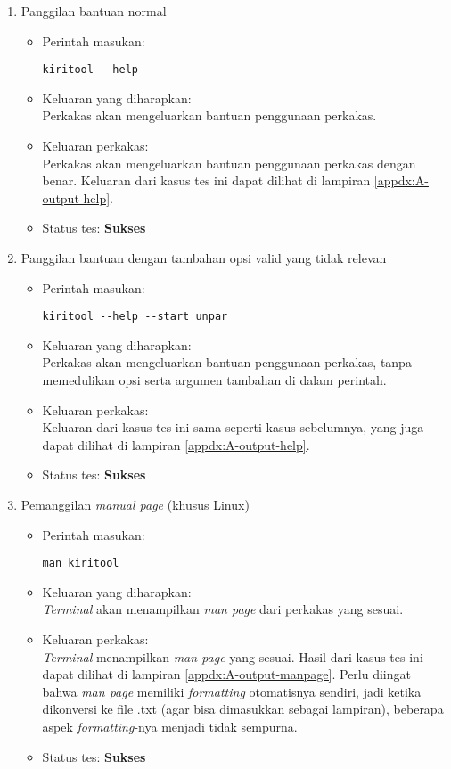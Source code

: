 \begin{enumerate}
	\item Panggilan bantuan normal
	\begin{itemize}
		\item Perintah masukan:
		\begin{lstlisting}
kiritool --help
		\end{lstlisting}
		\item Keluaran yang diharapkan: \\
		Perkakas akan mengeluarkan bantuan penggunaan perkakas.
		\item Keluaran perkakas: \\
		Perkakas akan mengeluarkan bantuan penggunaan perkakas dengan benar. Keluaran dari kasus tes ini dapat dilihat di lampiran \ref{appdx:A-output-help}.
		\item Status tes: \textbf{Sukses}
	\end{itemize}
	
	\item Panggilan bantuan dengan tambahan opsi valid yang tidak relevan
	\begin{itemize}
		\item Perintah masukan:
		\begin{lstlisting}
kiritool --help --start unpar
		\end{lstlisting}
		\item Keluaran yang diharapkan: \\
		Perkakas akan mengeluarkan bantuan penggunaan perkakas, tanpa memedulikan opsi serta argumen tambahan di dalam perintah.
		\item Keluaran perkakas: \\
		Keluaran dari kasus tes ini sama seperti kasus sebelumnya, yang juga dapat dilihat di lampiran \ref{appdx:A-output-help}.
		\item Status tes: \textbf{Sukses}
	\end{itemize}
	
	\item Pemanggilan \textit{manual page} (khusus Linux)
	\begin{itemize}
		\item Perintah masukan:
		\begin{lstlisting}
man kiritool
		\end{lstlisting}
		\item Keluaran yang diharapkan: \\
		\textit{Terminal} akan menampilkan \textit{man page} dari perkakas yang sesuai.
		\item Keluaran perkakas: \\
		\textit{Terminal} menampilkan \textit{man page} yang sesuai. Hasil dari kasus tes ini dapat dilihat di lampiran \ref{appdx:A-output-manpage}. Perlu diingat bahwa \textit{man page} memiliki \textit{formatting} otomatisnya sendiri, jadi ketika dikonversi ke file .txt (agar bisa dimasukkan sebagai lampiran), beberapa aspek \textit{formatting}-nya menjadi tidak sempurna.
		\item Status tes: \textbf{Sukses}
	\end{itemize}
	

\end{enumerate}
